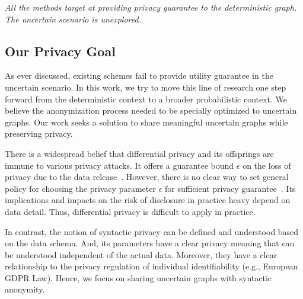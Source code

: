 \emph{All the methods target at providing privacy guarantee to the deterministic graph. The uncertain scenario is unexplored.}

\subsection{Our Privacy Goal}
As ever discussed, existing schemes fail to provide utility guarantee in the uncertain scenario. 
In this work, we try to move this line of research one step forward from the deterministic context to a broader probabilistic context. 
We believe the anonymization process needed to be specially optimized to uncertain graphs.
Our work seeks a solution to share meaningful uncertain graphs while preserving privacy.

There is a widespread belief that differential privacy and its offsprings are immune to various privacy attacks. It offers a guarantee bound $\epsilon$ on the loss of privacy due to the data release~\cite{Sala_Sharing_2011,Xiao_Differentially_2014}. However, there is no clear way to set general policy for choosing the privacy parameter $\epsilon$ for sufficient privacy guarantee~\cite{lee2011}. Its implications and impacts on the risk of disclosure in practice heavy depend on data detail. Thus, differential privacy is difficult to apply in practice. 

In contrast, the notion of syntactic privacy can be defined and understood based on the data schema. And, its parameters have a clear privacy meaning that can be understood independent of the actual data. Moreover, they have a clear relationship to the privacy regulation of individual identifiability (e.g., European GDPR Law). 
Hence, we focus on sharing uncertain graphs with syntactic anonymity. 
